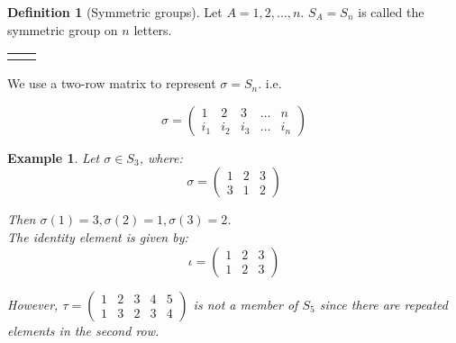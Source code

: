 \documentclass{article}
\theoremstyle{MyNonumberplain}
\theoremstyle{break}
\newcommand{\nline}{\begin{tabular}{ll}&\\\end{tabular}}
\theoremstyle{break}
\newtheorem{example}{Example}[section]
\theoremstyle{break}
\theoremstyle{definition}
\theoremstyle{break}
\newtheorem{definition}{Definition}[section]
\begin{document}
\begin{defbox}
    \begin{definition}[Symmetric groups]
        Let $A={1,2,...,n}$. $S_A=S_n$ is called the symmetric group on $n$ letters.

        \nline

        We use a two-row matrix to represent $\sigma = S_n$. i.e. 

        \[ \sigma = \left(\begin{array}{ccccc}
            1 & 2 & 3 & \ldots & n\\
            i_1 & i_2 & i_3 & \ldots & i_n
          \end{array}\right) \]
    \end{definition}
\end{defbox}

\begin{expbox}
    \begin{example}
        Let $\sigma\in S_3$, where:
        \[ \sigma = \left(\begin{array}{ccc}
            1 & 2 & 3\\
            3 & 1 & 2
          \end{array}\right) \]

          Then $\sigma(1)=3,\sigma(2)=1,\sigma(3)=2$.\\

          The identity element is given by:
          \[ \iota = \left(\begin{array}{ccc}
            1 & 2 & 3\\
            1 & 2 & 3
          \end{array}\right) \]

          However, $\tau = \left(\begin{array}{ccccc}
            1 & 2 & 3 & 4 & 5\\
            1 & 3 & 2 & 3 & 4
          \end{array}\right)$ is not a member of $S_5$ since there are repeated elements in the second row.
    \end{example}
\end{expbox}
\end{document}
